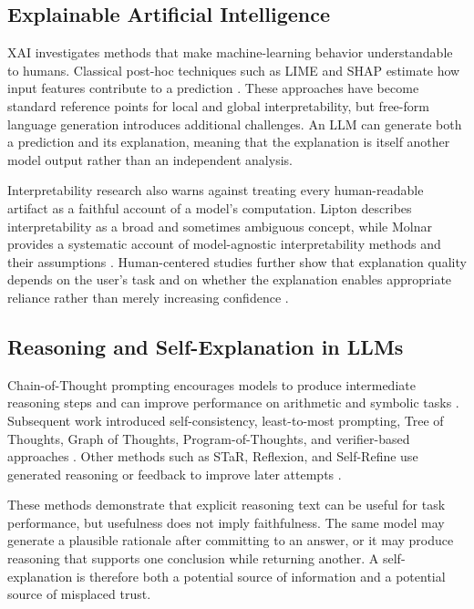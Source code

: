 \documentclass{article}
\begin{document}
\subsection{Explainable Artificial Intelligence}

XAI investigates methods that make machine-learning behavior understandable to humans. Classical post-hoc techniques such as LIME and SHAP estimate how input features contribute to a prediction \cite{ribeiro2016trust,lundberg2017unified}. These approaches have become standard reference points for local and global interpretability, but free-form language generation introduces additional challenges. An LLM can generate both a prediction and its explanation, meaning that the explanation is itself another model output rather than an independent analysis.

Interpretability research also warns against treating every human-readable artifact as a faithful account of a model's computation. Lipton describes interpretability as a broad and sometimes ambiguous concept, while Molnar provides a systematic account of model-agnostic interpretability methods and their assumptions \cite{lipton2018mythos,molnar2022interpretable}. Human-centered studies further show that explanation quality depends on the user's task and on whether the explanation enables appropriate reliance rather than merely increasing confidence \cite{miller2019explanation,brahman2022human}.

\subsection{Reasoning and Self-Explanation in LLMs}

Chain-of-Thought prompting encourages models to produce intermediate reasoning steps and can improve performance on arithmetic and symbolic tasks \cite{wei2022chain}. Subsequent work introduced self-consistency, least-to-most prompting, Tree of Thoughts, Graph of Thoughts, Program-of-Thoughts, and verifier-based approaches \cite{wang2023selfconsistency,zhou2023least,yao2023tree,besta2024graph,chen2023program,chen2023machine}. Other methods such as STaR, Reflexion, and Self-Refine use generated reasoning or feedback to improve later attempts \cite{zelikman2022star,shinn2023reflexion,madaan2023selfrefine}.

These methods demonstrate that explicit reasoning text can be useful for task performance, but usefulness does not imply faithfulness. The same model may generate a plausible rationale after committing to an answer, or it may produce reasoning that supports one conclusion while returning another. A self-explanation is therefore both a potential source of information and a potential source of misplaced trust.
\end{document}
